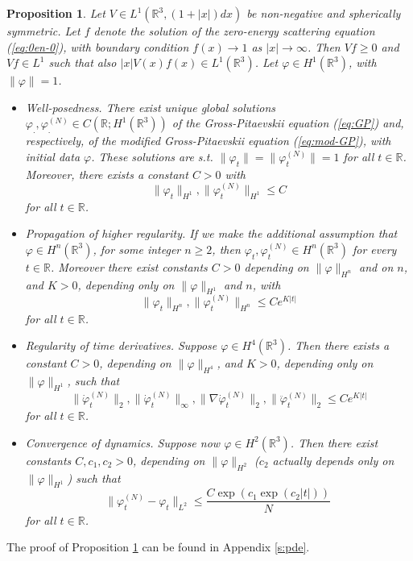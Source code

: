 \documentclass[11pt,a4paper]{article}
\newtheorem{proposition}[thm]{Proposition}
\newcommand{\bR}{{\mathbb R}}
\begin{document}
\begin{proposition} \label{t:pdes}
Let $V \in L^1 (\bR^3, (1+|x|) dx)$ be non-negative and spherically symmetric. Let $f$ denote the solution of the zero-energy scattering equation (\ref{eq:0en-0}), with boundary condition $f(x) \to 1$ as $|x| \to \infty$. Then $Vf \geq 0$ and $Vf \in L^1$ such that also $|x| V(x) f(x) \in L^1 (\bR^3)$. Let $\varphi \in H^1 (\bR^3)$, with $\| \varphi \| = 1$.
\begin{itemize}
\item[(i)] Well-posedness. There exist unique global solutions $\varphi_. , \varphi_.^{(N)} \in C(\bR ; H^1 (\bR^3))$ of the Gross-Pitaevskii equation (\ref{eq:GP}) and, respectively, of the modified Gross-Pitaevskii equation (\ref{eq:mod-GP}), with initial data $\varphi$. These solutions are s.t. $\| \varphi_t \| = \| \varphi_t^{(N)} \| = 1$ for all $t \in \bR$. Moreover, there exists a constant $C > 0$ with 
\[  \| \varphi_t \|_{H^1} , \| \varphi_t^{(N)} \|_{H^1} \leq C \]
for all $t \in \bR$. 
\item[(ii)] Propagation of higher regularity. If we make the additional assumption that $\varphi \in H^n (\bR^3)$, for some integer $n \geq 2$, then $\varphi_t , \varphi_t^{(N)} \in H^n (\bR^3)$ for every $t \in \bR$. Moreover there exist constants $C>0$ depending on $\| \varphi \|_{H^n}$ and on $n$, and $K >0$, depending only on $\| \varphi \|_{H^1}$ and $n$, with
\begin{equation}\label{eq:hireg} \| \varphi_t \|_{H^n} , \| \varphi_t^{(N)} \|_{H^n} \leq C e^{K |t|} \end{equation}
for all $t \in \bR$. 
\item[(iii)] Regularity of time derivatives. Suppose $\varphi \in H^4 (\bR^3)$. Then there exists a constant $C>0$, depending on $\| \varphi \|_{H^4}$,  and $K > 0$, depending only on $\| \varphi \|_{H^1}$, such that
\[  \|\dot{\varphi}_t^{(N)} \|_2 , \| \dot{\varphi}_t^{(N)} \|_\infty , \| \nabla \dot{\varphi}_t^{(N)} \|_2 , \| \ddot{\varphi}_t^{(N)} \|_2 \leq C e^{K |t|} \]
for all $t \in \bR$.
\item[(iv)] Convergence of dynamics. Suppose now $\varphi \in H^2 (\bR^3)$. Then there exist constants $C,c_1,c_2 > 0$, depending on $\| \varphi \|_{H^2}$ ($c_2$ actually depends only on $\| \varphi \|_{H^1}$) such that 
\[ \| \varphi_t^{(N)} - \varphi_t \|_{L^2} \leq \frac{C \exp (c_1 \exp (c_2 |t|))}{N} \,  \]
for all $t \in \bR$.
\end{itemize}
\end{proposition} 
The proof of Proposition \ref{t:pdes} can be found in Appendix \ref{s:pde}. 
\end{document}

